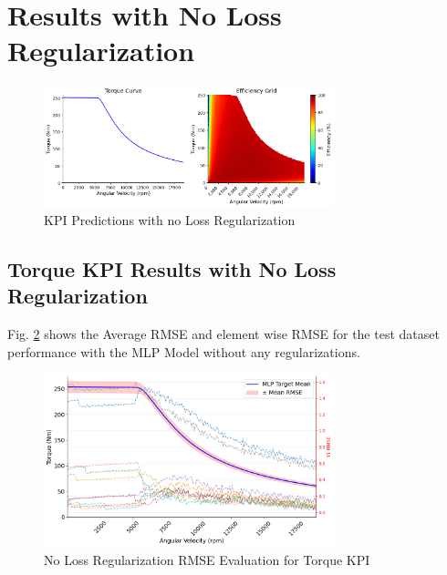 \documentclass{report} %
\begin{document}
\section{Results with No Loss Regularization}\label{sec:Results with No Loss Regularization}

\begin{figure}[H]
    \centering
    \includegraphics[width=0.75\textwidth]{./ReportImages/predictions_no_lossreg.png} 
    \caption{KPI Predictions with no Loss Regularization} 
    \label{KPI Predictions with no Loss Regularization}
\end{figure}
\subsection{Torque KPI Results with No Loss Regularization}\label{subsec:Torque KPI Results with No Loss Regularization}

Fig. \ref{fig:No Loss Regularization RMSE Evaluation for 2D KPI(Torque)} shows the Average \ac{RMSE} and element wise \ac{RMSE} for the test dataset 
performance with the MLP Model without any regularizations.

\begin{figure}[H]
    \centering
    \includegraphics[width=0.75\textwidth]{./ReportImages/RMSE_MLP_no_lossreg_y1.png} 
    \caption{No Loss Regularization \ac{RMSE} Evaluation for Torque \ac{KPI}} 
    \label{fig:No Loss Regularization RMSE Evaluation for 2D KPI(Torque)}
\end{figure}
\end{document}
